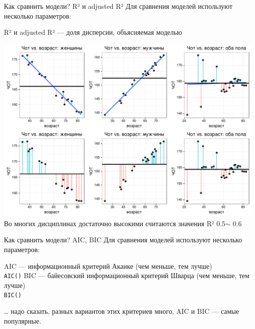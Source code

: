 \begin{frame}{Как сравнить модели? R² и adjusted R²}
Для сравнения моделей используют несколько параметров:
\begin{itemize}
\mytem R² и adjusted R² — доля дисперсии, объясняемая моделью
\end{itemize}
\includegraphics[width=0.76\linewidth]{r2.pdf}\\
\vfill
Во многих дисциплинах достаточно высокими считаются значения R² 0.5$\sim$ 0.6
\end{frame}

\begin{frame}{Как сравнить модели? AIC, BIC}
Для сравнения моделей используют несколько параметров:
\begin{itemize}
\mytem AIC — информационный критерий Акаике (чем меньше, тем лучше)\\
\scriptsize\verb"AIC()"\normalsize
\mytem BIC — байесовский информационный критерий Шварца (чем меньше, тем лучше)\\
\scriptsize\verb"BIC()"\normalsize
\end{itemize}
… надо сказать, разных вариантов этих критериев много, AIC и BIC —  самые популярные.
\end{frame}

